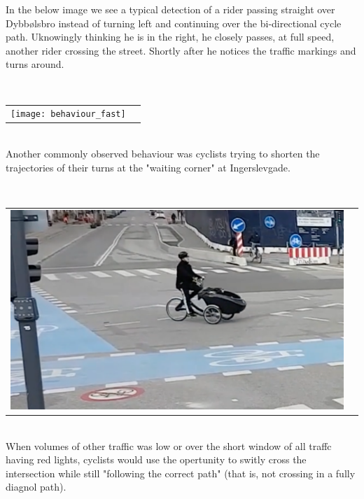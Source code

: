 In the below image we see a typical detection of a rider passing straight over Dybbølsbro instead of turning left and 
continuing over the bi-directional cycle path. Uknowingly thinking he is in the right, he closely passes, at full speed, another rider crossing
the street. Shortly after he notices the traffic markings and turns around. 

\ \\ 
\raggedbottom
\begin{tabular}{@{}cc}
\texttt{[image: behaviour\_fast]} 
\end{tabular}
\label{Alert}
\ \\

Another commonly observed behaviour was cyclists trying to shorten the trajectories of their turns 
at the "waiting corner" at Ingerslevgade.

\raggedbottom
\ \\ 
\noindent
\begin{tabular}{@{}cc}
\includegraphics[width=1.0\columnwidth]{shorten_traj} 
\end{tabular}
\label{Alert}
\ \\

When volumes of other traffic was low or over the short window of all traffc having red lights, cyclists would use the opertunity 
to switly cross the intersection while still "following the correct path" (that is, not crossing in a fully diagnol path). 


